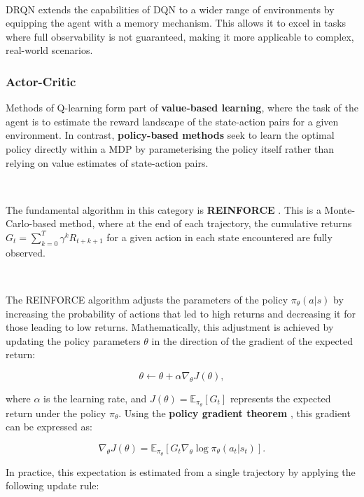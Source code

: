 \documentclass{article}
\begin{document}
\

DRQN extends the capabilities of DQN to a wider range of environments by equipping the agent with a memory mechanism. This allows it to excel in tasks where full observability is not guaranteed, making it more applicable to complex, real-world scenarios.

\subsubsection{Actor-Critic} 

Methods of Q-learning form part of \textbf{value-based learning}, where the task of the agent is to estimate the reward landscape of the state-action pairs for a given environment. In contrast, \textbf{policy-based methods} seek to learn the optimal policy directly within a MDP by parameterising the policy itself rather than relying on value estimates of state-action pairs.

\

The fundamental algorithm in this category is \textbf{REINFORCE} \citep{williams1992simple}. This is a Monte-Carlo-based method, where at the end of each trajectory, the cumulative returns $G_t = \sum_{k=0}^{T} \gamma^k R_{t+k+1}$ for a given action in each state encountered are fully observed.

\

The REINFORCE algorithm adjusts the parameters of the policy $\pi_\theta(a|s)$ by increasing the probability of actions that led to high returns and decreasing it for those leading to low returns. Mathematically, this adjustment is achieved by updating the policy parameters $\theta$ in the direction of the gradient of the expected return:

\begin{equation}
\theta \leftarrow \theta + \alpha \nabla_\theta J(\theta),
\end{equation}

where $\alpha$ is the learning rate, and $J(\theta) = \mathbb{E}_{\pi_\theta} [G_t]$ represents the expected return under the policy $\pi_\theta$. Using the \textbf{policy gradient theorem} \citep{sutton1999policy}, this gradient can be expressed as:

\begin{equation}
\nabla_\theta J(\theta) = \mathbb{E}_{\pi_\theta} \left[ G_t \nabla_\theta \log \pi_\theta(a_t | s_t) \right].
\end{equation}

In practice, this expectation is estimated from a single trajectory by applying the following update rule:
\end{document}
